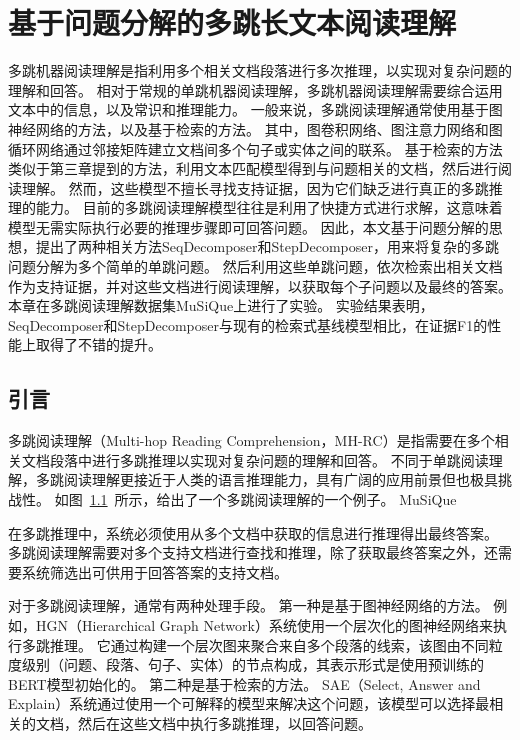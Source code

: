 \chapter{基于问题分解的多跳长文本阅读理解}
多跳机器阅读理解是指利用多个相关文档段落进行多次推理，以实现对复杂问题的理解和回答。
相对于常规的单跳机器阅读理解，多跳机器阅读理解需要综合运用文本中的信息，以及常识和推理能力。
一般来说，多跳阅读理解通常使用基于图神经网络的方法，以及基于检索的方法。
其中，图卷积网络、图注意力网络和图循环网络通过邻接矩阵建立文档间多个句子或实体之间的联系。
基于检索的方法类似于第三章提到的方法，利用文本匹配模型得到与问题相关的文档，然后进行阅读理解。
然而，这些模型不擅长寻找支持证据，因为它们缺乏进行真正的多跳推理的能力。
目前的多跳阅读理解模型往往是利用了快捷方式进行求解，这意味着模型无需实际执行必要的推理步骤即可回答问题。
因此，本文基于问题分解的思想，提出了两种相关方法SeqDecomposer和StepDecomposer，用来将复杂的多跳问题分解为多个简单的单跳问题。
然后利用这些单跳问题，依次检索出相关文档作为支持证据，并对这些文档进行阅读理解，以获取每个子问题以及最终的答案。
本章在多跳阅读理解数据集MuSiQue上进行了实验。
实验结果表明，SeqDecomposer和StepDecomposer与现有的检索式基线模型相比，在证据F1的性能上取得了不错的提升。

\section{引言}
多跳阅读理解\cite{Yang2018HotpotQAAD}（Multi-hop Reading Comprehension，MH-RC）是指需要在多个相关文档段落中进行多跳推理以实现对复杂问题的理解和回答。
不同于单跳阅读理解，多跳阅读理解更接近于人类的语言推理能力，具有广阔的应用前景但也极具挑战性。
如图~\ref{}~所示，给出了一个多跳阅读理解的一个例子。
MuSiQue

在多跳推理中，系统必须使用从多个文档中获取的信息进行推理得出最终答案。
多跳阅读理解需要对多个支持文档进行查找和推理，除了获取最终答案之外，还需要系统筛选出可供用于回答答案的支持文档。

对于多跳阅读理解，通常有两种处理手段。
第一种是基于图神经网络的方法。
例如，HGN\cite{Fang2019HierarchicalGN}（Hierarchical Graph Network）系统使用一个层次化的图神经网络来执行多跳推理。
它通过构建一个层次图来聚合来自多个段落的线索，该图由不同粒度级别（问题、段落、句子、实体）的节点构成，其表示形式是使用预训练的BERT模型初始化的。
第二种是基于检索的方法。
SAE\cite{Tu2019SelectAA}（Select, Answer and Explain）系统通过使用一个可解释的模型来解决这个问题，该模型可以选择最相关的文档，然后在这些文档中执行多跳推理，以回答问题。

